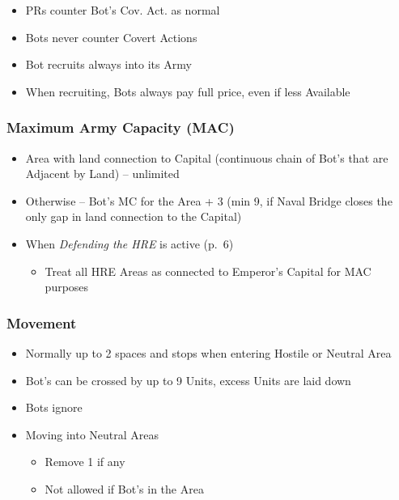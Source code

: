 \documentclass[10pt]{article}
\begin{document}
\begin{itemize}
	\item PRs counter Bot's Cov. Act. as normal
	\item Bots never counter Covert Actions 
\end{itemize}

\begin{itemize}
	\item Bot recruits always into its Army
	\item When recruiting, Bots always pay full \botpower price, even if less Available \manpower
\end{itemize}

\subsubsection*{Maximum Army Capacity (MAC)}
\begin{itemize}
	\item Area with land connection to Capital (continuous chain of Bot's \towns that are Adjacent by Land) -- unlimited
	\item Otherwise -- Bot's MC for the Area + 3 (min 9, if Naval Bridge closes the only gap in land connection to the Capital)
	\item When \emph{Defending the HRE} is active (p.~6)
	\begin{itemize}
		\item Treat all HRE Areas as connected to Emperor's Capital for MAC purposes
	\end{itemize}
\end{itemize}

\subsubsection*{Movement}
\begin{itemize}
	\item Normally up to 2 spaces and stops when entering Hostile or Neutral Area
	\item Bot's  can be crossed by up to 9 Units, excess Units are laid down
	\item Bots ignore 
	\item Moving into Neutral Areas
	\begin{itemize}
		\item Remove 1 \influence if any
		\item Not allowed if Bot's \claim in the Area
	\end{itemize}
\end{itemize}
\end{document}
